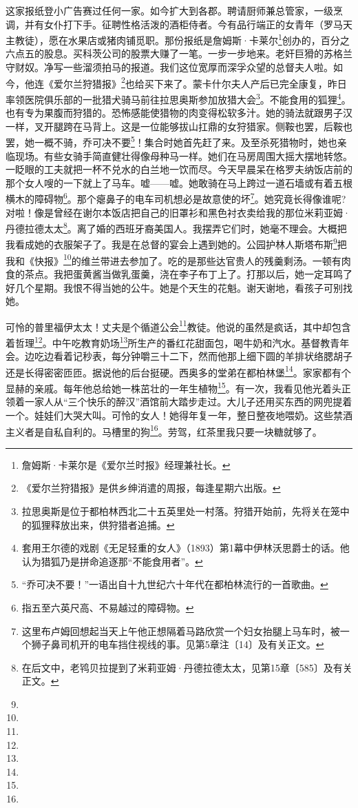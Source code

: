 \par 这家报纸登小广告赛过任何一家。如今扩大到各郡。聘请厨师兼总管家，一级烹调，并有女仆打下手。征聘性格活泼的酒柜侍者。今有品行端正的女青年（罗马天主教徒），愿在水果店或猪肉铺觅职。那份报纸是詹姆斯·卡莱尔\footnote{詹姆斯·卡莱尔是《爱尔兰时报》经理兼社长。}创办的，百分之六点五的股息。买科茨公司的股票大赚了一笔。一步一步地来。老奸巨猾的苏格兰守财奴。净写一些溜须拍马的报道。我们这位宽厚而深孚众望的总督夫人啦。如今，他连《爱尔兰狩猎报》\footnote{《爱尔兰狩猎报》是供乡绅消遣的周报，每逢星期六出版。}也给买下来了。蒙卡什尔夫人产后已完全康复，昨日率领医院俱乐部的一批猎犬骑马前往拉思奥斯参加放猎大会\footnote{拉思奥斯是位于都柏林西北二十五英里处一村落。狩猎开始前，先将关在笼中的狐狸释放出来，供狩猎者追捕。}。不能食用的狐狸\footnote{套用王尔德的戏剧《无足轻重的女人》（1893）第1幕中伊林沃思爵士的话。他认为猎狐乃是拼命追逐那“不能食用者”。}。也有专为果腹而狩猎的。恐怖感能使猎物的肉变得松软多汁。她的骑法就跟男子汉一样，叉开腿跨在马背上。这是一位能够拔山扛鼎的女狩猎家。侧鞍也罢，后鞍也罢，她一概不骑，乔可决不要\footnote{“乔可决不要！”一语出自十九世纪六十年代在都柏林流行的一首歌曲。}！集合时她首先赶了来。及至杀死猎物时，她也亲临现场。有些女骑手简直健壮得像母种马一样。她们在马房周围大摇大摆地转悠。一眨眼的工夫就把一杯不兑水的白兰地一饮而尽。今天早晨呆在格罗夫纳饭店前的那个女人嗖的一下就上了马车。嘘——嘘。她敢骑在马上跨过一道石墙或有着五根横木的障碍物\footnote{指五至六英尺高、不易越过的障碍物。}。那个瘪鼻子的电车司机想必是故意使的坏\footnote{这里布卢姆回想起当天上午他正想隔着马路欣赏一个妇女抬腿上马车时，被一个狮子鼻司机开的电车挡住视线的事。见第5章注〔14〕及有关正文。}。她究竟长得像谁呢?对啦！像是曾经在谢尔本饭店把自己的旧罩衫和黑色衬衣卖给我的那位米莉亚姆·丹德拉德太太\footnote{在后文中，老鸨贝拉提到了米莉亚姆·丹德拉德太太，见第15章〔585〕及有关正文。}。离了婚的西班牙裔美国人。我摆弄它们时，她毫不理会。大概把我看成她的衣服架子了。我是在总督的宴会上遇到她的。公园护林人斯塔布斯\footnote{}把我和《快报》\footnote{}的维兰带进去参加了。吃的是那些达官贵人的残羹剩汤。一顿有肉食的茶点。我把蛋黄酱当做乳蛋羹，浇在李子布丁上了。打那以后，她一定耳鸣了好几个星期。我恨不得当她的公牛。她是个天生的花魁。谢天谢地，看孩子可别找她。
\par 可怜的普里福伊太太！丈夫是个循道公会\footnote{}教徒。他说的虽然是疯话，其中却包含着哲理\footnote{}。中午吃教育奶场\footnote{}所生产的番红花甜面包，喝牛奶和汽水。基督教青年会。边吃边看着记秒表，每分钟嚼三十二下，然而他那上细下圆的羊排状络腮胡子还是长得密密匝匝。据说他的后台挺硬。西奥多的堂弟在都柏林堡\footnote{}。家家都有个显赫的亲戚。每年他总给她一株茁壮的一年生植物\footnote{}。有一次，我看见他光着头正领着一家人从“三个快乐的醉汉”酒馆前大踏步走过。大儿子还用买东西的网兜提着一个。娃娃们大哭大叫。可怜的女人！她得年复一年，整日整夜地喂奶。这些禁酒主义者是自私自利的。马槽里的狗\footnote{}。劳驾，红茶里我只要一块糖就够了。
